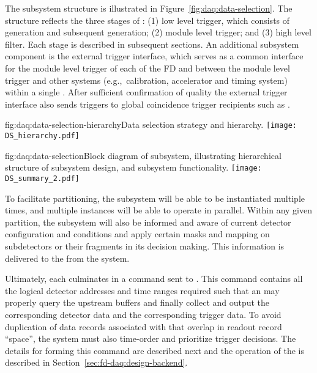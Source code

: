 The subsystem structure is illustrated in
Figure~\ref{fig:daq:data-selection}. The structure
reflects the three stages of : (1) low level trigger, which consists of
 generation and subsequent
 generation; (2) module level trigger; and (3)
high level filter. Each stage is described in subsequent
sections. An additional subsystem component is the external trigger interface,
which serves as a common interface for the
module level trigger of each of the FD  and between
the module level trigger and other systems (e.g.,~calibration,
accelerator and timing system) within a single
. After sufficient confirmation of quality the
external trigger interface also sends  triggers
to global coincidence trigger recipients such as   \cite{snews}.

\begin{dunefigure}{fig:daq:data-selection-hierarchy}{Data selection
    strategy and hierarchy.}
  \texttt{[image: DS\_hierarchy.pdf]}
\end{dunefigure}

\begin{dunefigure}{fig:daq:data-selection}{Block diagram of  
     subsystem, illustrating hierarchical structure of
    subsystem design, and subsystem functionality.}
  \texttt{[image: DS\_summary\_2.pdf]}
\end{dunefigure}

To facilitate partitioning, the  subsystem will be
able to be instantiated multiple times, and multiple instances will be
able to operate in parallel. Within any
given partition, the  subsystem will also be
informed and aware of current detector configuration and conditions and
apply certain masks and mapping on subdetectors or their fragments in
its decision making. This information is delivered to the
 from the  system.

Ultimately, each  culminates in a command sent to . 
This command contains all the logical detector addresses and time ranges
required such that an  may properly query the upstream 
buffers and finally collect and output the corresponding detector data
and the corresponding trigger data. To avoid duplication of data
records associated with  that overlap in readout
record ``space'', the  system must also time-order and
prioritize trigger decisions. The details for forming this
command are described next and the operation of the  is
described in Section~\ref{sec:fd-daq:design-backend}.

